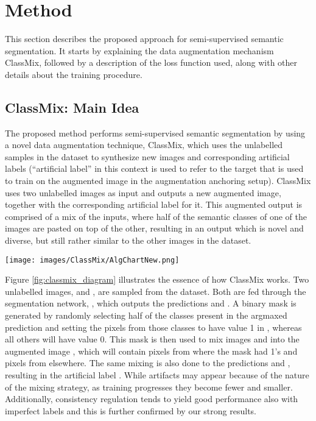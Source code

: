 \documentclass[10pt,twocolumn,letterpaper]{article}
\begin{document}
\section{Method}
This section describes the proposed approach for semi-supervised semantic segmentation. It starts by explaining the data augmentation mechanism ClassMix, followed by a description of the loss function used, along with other details about the training procedure.

\subsection{ClassMix: Main Idea}
The proposed method performs semi-supervised semantic segmentation by using a novel data augmentation technique, ClassMix, which uses the unlabelled samples in the dataset to synthesize new images and corresponding artificial labels (``artificial label'' in this context is used to refer to the target that is used to train on the augmented image in the augmentation anchoring setup). ClassMix uses two unlabelled images as input and outputs a new augmented image, together with the corresponding artificial label for it. This augmented output is comprised of a mix of the inputs, where half of the semantic classes of one of the images are pasted on top of the other, resulting in an output which is novel and diverse, but still rather similar to the other images in the dataset.

\begin{figure*}[tp!]
    \centering
    \texttt{[image: images/ClassMix/AlgChartNew.png]}
    \caption{ClassMix augmentation technique. Two images  and  are sampled from the unlabelled dataset. Based on the prediction  of image A, a binary mask  is created. The mask is then used to mix the images  and  and their respective predictions into an augmented image  and the corresponding artificial label .}
    \label{fig:classmix_diagram}
\end{figure*}

Figure \ref{fig:classmix_diagram} illustrates the essence of how ClassMix works. Two unlabelled images,  and , are sampled from the dataset. Both are fed through the segmentation network, , which outputs the predictions  and . A binary mask  is generated by randomly selecting half of the classes present in the argmaxed prediction  and setting the pixels from those classes to have value 1 in , whereas all others will have value 0. This mask is then used to mix images  and  into the augmented image , which will contain pixels from  where the mask had 1's and pixels from  elsewhere. The same mixing is also done to the predictions  and , resulting in the artificial label . While artifacts may appear because of  the  nature  of  the  mixing  strategy, as  training  progresses  they  become fewer and smaller. Additionally, consistency regulation tends to yield good performance also with imperfect labels and this is further confirmed by our strong results. 
\end{document}
